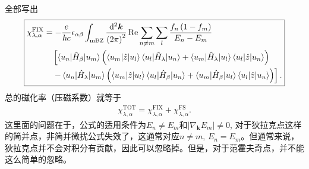 \documentclass[10pt, oneside]{article}
\begin{document}
全部写出
\begin{align}
	\begin{split}
		\boxed{
			\begin{aligned}
				\chi^{\mathrm{FIX}}_{\lambda, \alpha} &= - \frac{e}{ \hbar c } \epsilon_{\alpha \beta} \int_{\mathrm{mBZ}} \frac{\mathrm{d}^{2} \bm{k}}{\left(2 \pi\right)^2} \operatorname{Re} \sum_{n \neq m} \sum_{l} \frac{f_{n} \left(1 - f_{m }\right)}{E_{n } - E_{m }} \\
				& \quad \left[ \braket{u_{n} | \hat{H}_{\beta} | u_{m }} \left(\braket{u_{m} | \hat{z} | u_{l}} \braket{u_{l} | \hat{H}_{\lambda} | u_{n }} + \braket{u_{m} | \hat{H}_{\lambda}| u_{l}} \braket{u_{l} | \hat{z} | u_{n }}\right) \right. \\
				& \left. \quad - \braket{u_{n} | \hat{H}_{\lambda} | u_{m }} \left(\braket{u_{m} | \hat{z} | u_{l}} \braket{u_{l} | \hat{H}_{\beta} | u_{n}} + \braket{u_{m} | \hat{H}_{\beta}| u_{l}} \braket{u_{l} | \hat{z} | u_{n }}\right)
				\right].
			\end{aligned}
		}
	\end{split}
\end{align}
总的磁化率（压磁系数）就等于
\begin{align}
	\chi^{\mathrm{TOT}}_{\lambda, \alpha} = \chi^{\mathrm{FIX}}_{\lambda, \alpha} + \chi^{\mathrm{FS}}_{\lambda, \alpha}.
\end{align}
这里面的问题在于，公式的适用条件为\(E_{n } \neq E_{m }\)和\(\left|\nabla_{\bm{k}} E_{m}\right| \neq 0\), 对于狄拉克点这样的简并点，非简并微扰公式失效了，这通常对应\(n \neq m, \, E_{n} = E_{m}\)。但通常来说，狄拉克点并不会对积分有贡献，因此可以忽略掉。但是，对于范霍夫奇点，并不能这么简单的忽略。
\end{document}
